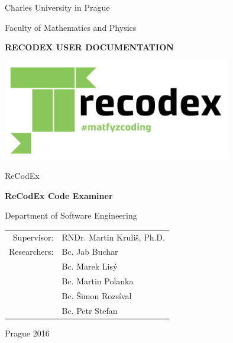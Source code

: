 \pagestyle{empty}
\hypersetup{pageanchor=false}
\begin{center}

\large

Charles University in Prague

\medskip

Faculty of Mathematics and Physics

\vfill

{\bf\Large RECODEX USER DOCUMENTATION}

\vfill

\centerline{\mbox{\includegraphics[width=100mm]{../logo/logo_recodex.png}}}

\vfill
\vspace{5mm}

{\LARGE ReCodEx}

\vspace{15mm}

{\LARGE\bfseries ReCodEx Code Examiner}

\vfill

Department of Software Engineering

\vfill

\begin{tabular}{rl}

Supervisor: & RNDr. Martin Kruliš, Ph.D. \\
\noalign{\vspace{2mm}}
Researchers: & Bc. Jab Buchar \\
			 & Bc. Marek Lisý \\
			 & Bc. Martin Polanka \\
			 & Bc. Šimon Rozsíval \\
			 & Bc. Petr Stefan \\
\end{tabular}

\vfill

Prague 2016

\end{center}

\newpage

\openright
\pagestyle{plain}
\setcounter{page}{1}
